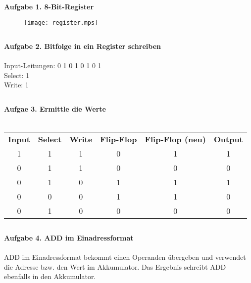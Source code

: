 \documentclass{article}
\begin{document}
\subsection*{}
\textbf {Aufgabe 1. 8-Bit-Register} \\

\begin{figure}[h]
\texttt{[image: register.mps]}
\end{figure}

\subsection*{}
\textbf{Aufgabe 2. Bitfolge in ein Register schreiben} \\ \\
Input-Leitungen: 0 1 0 1 0 1 0 1 \\
Select: 1 \\
Write: 1

\subsection*{}
\textbf{Aufgae 3. Ermittle die Werte} \\ \\
\begin{tabularx}{\linewidth}{c c c c c c}
\textbf{Input} & \textbf{Select} & \textbf{Write} & \textbf{Flip-Flop} & \textbf{Flip-Flop (neu)} & \textbf{Output} \\
1 & 1 & 1 & 0 & 1 & 1 \\
0 & 1 & 1 & 0 & 0 & 0 \\
0 & 1 & 0 & 1 & 1 & 1 \\
0 & 0 & 0 & 1 & 1 & 0 \\
0 & 1 & 0 & 0 & 0 & 0 \\
\end{tabularx}

\subsection*{}
\textbf{Aufgabe 4. ADD im Einadressformat} \\ \\
ADD im Einadressformat bekommt einen Operanden übergeben und verwendet die Adresse bzw. den Wert im Akkumulator. Das Ergebnis schreibt ADD ebenfalls in den Akkumulator.
\end{document}
